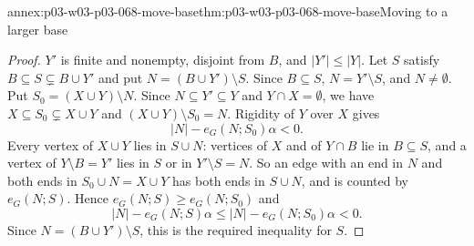 \begin{annexitem}{annex:p03-w03-p03-068-move-base}{thm:p03-w03-p03-068-move-base}{Moving to a larger base}
\begin{proof}
\(Y'\) is finite and nonempty, disjoint from \(B\), and \(|Y'|\leq|Y|\).  Let
\(S\) satisfy \(B\subseteq S\subsetneq B\cup Y'\) and put
\(N=(B\cup Y')\setminus S\).  Since \(B\subseteq S\), \(N=Y'\setminus S\), and
\(N\neq\emptyset\).  Put \(S_0=(X\cup Y)\setminus N\).  Since \(N\subseteq
Y'\subseteq Y\) and \(Y\cap X=\emptyset\), we have \(X\subseteq
S_0\subsetneq X\cup Y\) and \((X\cup Y)\setminus S_0=N\).  Rigidity of \(Y\)
over \(X\) gives
\[
  |N|-e_G(N;S_0)\alpha<0 .
\]
Every vertex of \(X\cup Y\) lies in \(S\cup N\): vertices of \(X\) and of
\(Y\cap B\) lie in \(B\subseteq S\), and a vertex of \(Y\setminus B=Y'\) lies
in \(S\) or in \(Y'\setminus S=N\).  So an edge with an end in \(N\) and both
ends in \(S_0\cup N=X\cup Y\) has both ends in \(S\cup N\), and is counted by
\(e_G(N;S)\).  Hence \(e_G(N;S)\geq e_G(N;S_0)\) and
\[
  |N|-e_G(N;S)\alpha\leq|N|-e_G(N;S_0)\alpha<0 .
\]
Since \(N=(B\cup Y')\setminus S\), this is the required inequality for \(S\).
\end{proof}
\end{annexitem}

